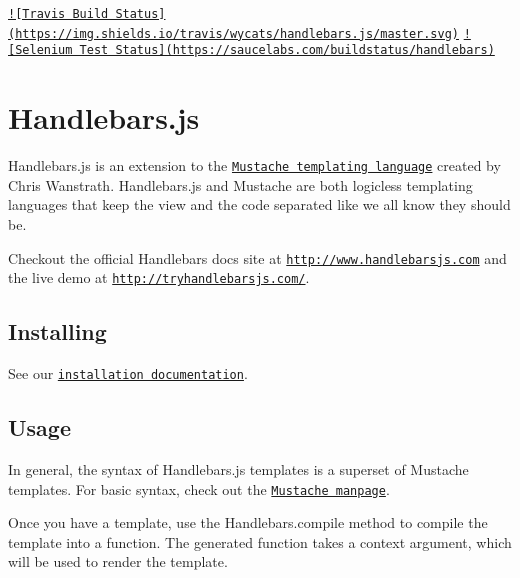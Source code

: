 \href{https://travis-ci.org/wycats/handlebars.js}{\tt !\mbox{[}Travis Build Status\mbox{]}(https\+://img.\+shields.\+io/travis/wycats/handlebars.\+js/master.\+svg)} \href{https://saucelabs.com/u/handlebars}{\tt !\mbox{[}Selenium Test Status\mbox{]}(https\+://saucelabs.\+com/buildstatus/handlebars)}

\section*{Handlebars.\+js }

Handlebars.\+js is an extension to the \href{http://mustache.github.com/}{\tt Mustache templating language} created by Chris Wanstrath. Handlebars.\+js and Mustache are both logicless templating languages that keep the view and the code separated like we all know they should be.

Checkout the official Handlebars docs site at \href{http://www.handlebarsjs.com}{\tt http\+://www.\+handlebarsjs.\+com} and the live demo at \href{http://tryhandlebarsjs.com/}{\tt http\+://tryhandlebarsjs.\+com/}.

\subsection*{Installing }

See our \href{http://handlebarsjs.com/installation.html}{\tt installation documentation}.

\subsection*{Usage }

In general, the syntax of Handlebars.\+js templates is a superset of Mustache templates. For basic syntax, check out the \href{http://mustache.github.com/mustache.5.html}{\tt Mustache manpage}.

Once you have a template, use the {\ttfamily Handlebars.\+compile} method to compile the template into a function. The generated function takes a context argument, which will be used to render the template.


